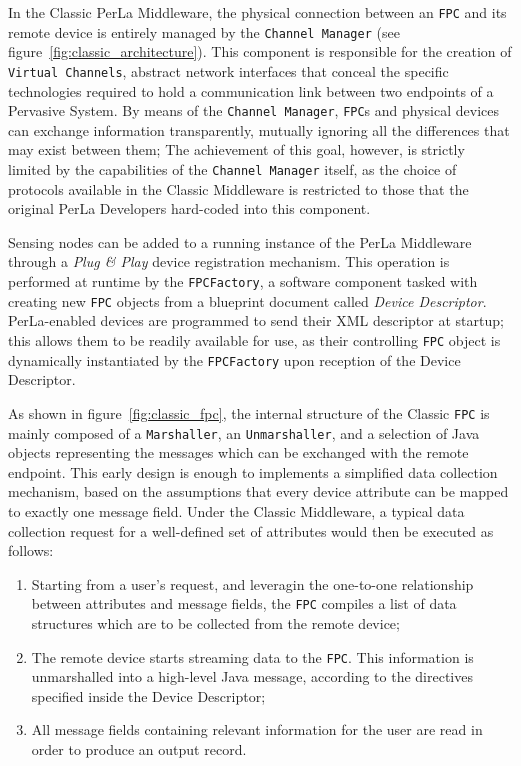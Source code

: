 In the Classic PerLa Middleware, the physical connection between an
\texttt{FPC} and its remote device is entirely managed by the \texttt{Channel
Manager} (see figure~\ref{fig:classic_architecture}). This component is
responsible for the creation of \texttt{Virtual Channels}, abstract network
interfaces that conceal the specific technologies required to hold a
communication link between two endpoints of a Pervasive System. By means of the
\texttt{Channel Manager}, \texttt{FPC}s and physical devices can exchange
information transparently, mutually ignoring all the differences that may exist
between them; The achievement of this goal, however, is strictly limited by the
capabilities of the \texttt{Channel Manager} itself, as the choice of protocols
available in the Classic Middleware is restricted to those that the original
PerLa Developers hard-coded into this component.

Sensing nodes can be added to a running instance of the PerLa Middleware
through a \textit{Plug \& Play} device registration mechanism. This operation
is performed at runtime by the \texttt{FPCFactory}, a software component tasked
with creating new \texttt{FPC} objects from a blueprint document called
\textit{Device Descriptor}. PerLa-enabled devices are programmed to send their
XML descriptor at startup; this allows them to be readily available for use, as
their controlling \texttt{FPC} object is dynamically instantiated by the
\texttt{FPCFactory} upon reception of the Device Descriptor.

As shown in figure~\ref{fig:classic_fpc}, the internal structure of the Classic
\texttt{FPC} is mainly composed of a \texttt{Marshaller}, an
\texttt{Unmarshaller}, and a selection of Java objects representing the
messages which can be exchanged with the remote endpoint. This early design is
enough to implements a simplified data collection mechanism, based on the
assumptions that every device attribute can be mapped to exactly one message
field. Under the Classic Middleware, a typical data collection request for a
well-defined set of attributes would then be executed as follows:

\begin{enumerate}

    \item Starting from a user's request, and leveragin the one-to-one
        relationship between attributes and message fields, the \texttt{FPC}
        compiles a list of data structures which are to be collected from the
        remote device;

    \item The remote device starts streaming data to the \texttt{FPC}. This
        information is unmarshalled into a high-level Java message, according
        to the directives specified inside the Device Descriptor;

    \item All message fields containing relevant information for the user are
        read in order to produce an output record.

\end{enumerate}

